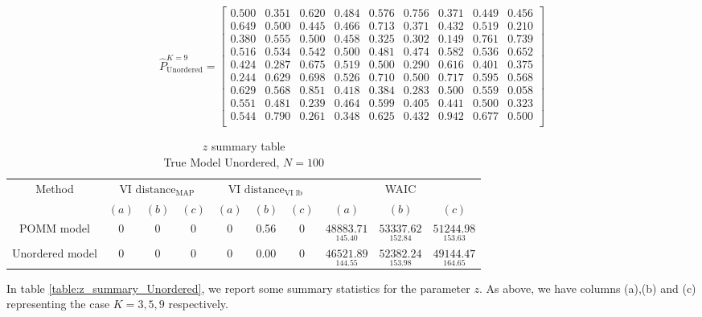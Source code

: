 \documentclass[11pt]{amsart}
\begin{document}
\[ 
\hat{P}^{K=9}_{\text{Unordered}} = 
\left[\begin{array}{ccccccccc}
0.500 & 0.351 & 0.620 & 0.484 & 0.576 & 0.756 & 0.371 & 0.449 & 0.456 \\
0.649 & 0.500 & 0.445 & 0.466 & 0.713 & 0.371 & 0.432 & 0.519 & 0.210 \\
0.380 & 0.555 & 0.500 & 0.458 & 0.325 & 0.302 & 0.149 & 0.761 & 0.739 \\
0.516 & 0.534 & 0.542 & 0.500 & 0.481 & 0.474 & 0.582 & 0.536 & 0.652 \\
0.424 & 0.287 & 0.675 & 0.519 & 0.500 & 0.290 & 0.616 & 0.401 & 0.375 \\
0.244 & 0.629 & 0.698 & 0.526 & 0.710 & 0.500 & 0.717 & 0.595 & 0.568 \\
0.629 & 0.568 & 0.851 & 0.418 & 0.384 & 0.283 & 0.500 & 0.559 & 0.058 \\
0.551 & 0.481 & 0.239 & 0.464 & 0.599 & 0.405 & 0.441 & 0.500 & 0.323 \\
0.544 & 0.790 & 0.261 & 0.348 & 0.625 & 0.432 & 0.942 & 0.677 & 0.500 \\
\end{array}\right]
\]


\begin{table}[htbp]
\centering
\caption{
{\large $z$ summary table} \\ 
{\small True Model Unordered, $N=100$}
} 
\begin{tabular}{cccccccccc}
\toprule
\multirow{2}{*}{Method} & \multicolumn{3}{c}{
VI $\text{distance}_{\text{MAP}}$} & \multicolumn{3}{c}{
VI $\text{distance}_{\text{VI lb}}$} & \multicolumn{3}{c}{WAIC} \\
\cmidrule(lr){2-4} \cmidrule(lr){5-7} \cmidrule(lr){8-10}
& $(a)$ & $(b)$ & $(c)$ & $(a)$ & $(b)$ & $(c)$ & $(a)$ & $(b)$ & $(c)$ \\
\midrule
POMM model  &0 & 0 & 0 & 0 & 0.56 & 0   & $\underset{145.40}{48883.71}$ & $\underset{152.84}{53337.62}$ & $\underset{153.63}{51244.98}$  \\
Unordered model &0 & 0 & 0 & 0 & 0.00 & 0 & $\underset{144.55}{46521.89}$& $\underset{153.98}{52382.24}$ & $\underset{ 164.65}{49144.47}$  \\
\bottomrule
\end{tabular}
\label{table:z_summary_Unordered}
\end{table}

In table \eqref{table:z_summary_Unordered}, we report some summary statistics for the parameter $z$. As above, we have columns (a),(b) and (c) representing the case $K=3,5,9$ respectively.
\end{document}
